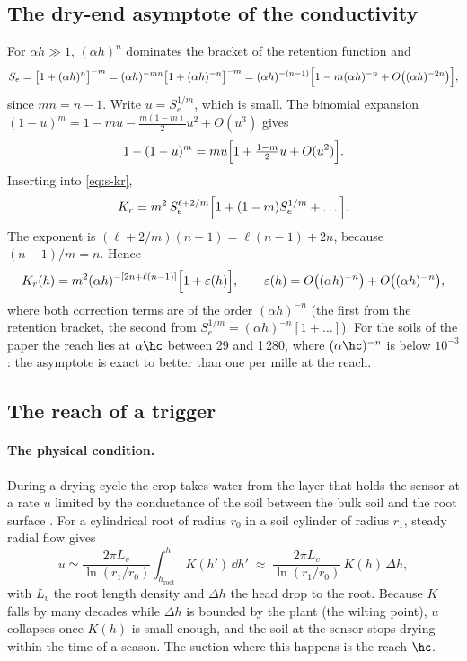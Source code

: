 \subsection{The dry-end asymptote of the conductivity}
For $\alpha h\gg1$, $(\alpha h)^n$ dominates the bracket of the retention function and
\begin{equation}
S_e=\bigl[1+(\alpha h)^n\bigr]^{-m}=(\alpha h)^{-mn}\bigl[1+(\alpha h)^{-n}\bigr]^{-m}=(\alpha h)^{-(n-1)}\Bigl[1-m(\alpha h)^{-n}+O\bigl((\alpha h)^{-2n}\bigr)\Bigr],
\end{equation}
since $mn=n-1$. Write $u=S_e^{1/m}$, which is small. The binomial expansion $(1-u)^{m}=1-mu-\tfrac{m(1-m)}{2}u^2+O(u^3)$ gives
\begin{equation}
1-(1-u)^{m}=mu\Bigl[1+\tfrac{1-m}{2}u+O(u^2)\Bigr].
\end{equation}
Inserting into \cref{eq:s-kr},
\begin{equation}
K_r=m^{2}\,S_e^{\ell+2/m}\Bigl[1+(1-m)S_e^{1/m}+\dots\Bigr].
\end{equation}
The exponent is $(\ell+2/m)(n-1)=\ell(n-1)+2n$, because $(n-1)/m=n$. Hence
\begin{equation}
K_r(h)=m^{2}(\alpha h)^{-[2n+\ell(n-1)]}\Bigl[1+\varepsilon(h)\Bigr],\qquad \varepsilon(h)=O\bigl((\alpha h)^{-n}\bigr)+O\bigl((\alpha h)^{-n}\bigr), \label{eq:s-asym}
\end{equation}
where both correction terms are of the order $(\alpha h)^{-n}$ (the first from the retention bracket, the second from $S_e^{1/m}=(\alpha h)^{-n}[1+\dots]$). For the soils of the paper the reach lies at $\alpha\hc$ between 29 and 1\,280, where $(\alpha\hc)^{-n}$ is below $10^{-3}$: the asymptote is exact to better than one per mille at the reach.

\subsection{The reach of a trigger}
\paragraph{The physical condition.} During a drying cycle the crop takes water from the layer that holds the sensor at a rate $u$ limited by the conductance of the soil between the bulk soil and the root surface \citep{Gardner1960}. For a cylindrical root of radius $r_0$ in a soil cylinder of radius $r_1$, steady radial flow gives
\begin{equation}
u\simeq\frac{2\pi L_v}{\ln(r_1/r_0)}\int_{h_{\mathrm{root}}}^{h}K(h')\,\dd h' \;\approx\; \frac{2\pi L_v}{\ln(r_1/r_0)}\,K(h)\,\Delta h,
\end{equation}
with $L_v$ the root length density and $\Delta h$ the head drop to the root. Because $K$ falls by many decades while $\Delta h$ is bounded by the plant (the wilting point), $u$ collapses once $K(h)$ is small enough, and the soil at the sensor stops drying within the time of a season. The suction where this happens is the reach $\hc$.
